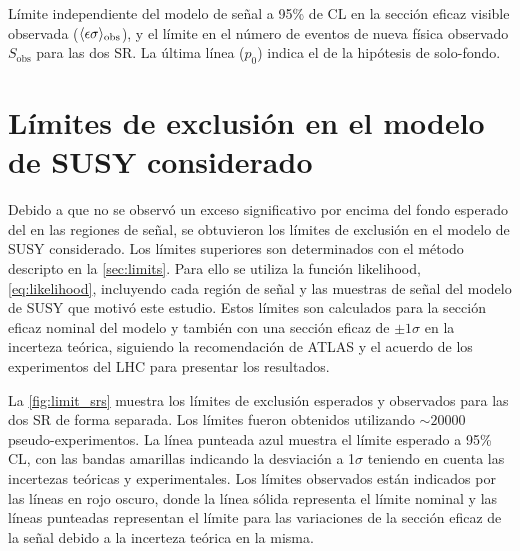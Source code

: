 \begin{table}[!htbp]
  \centering

  \caption{Límite independiente del modelo de señal a 95\% de CL en la
    sección eficaz visible observada ($\langle\epsilon{\rm \sigma}\rangle_{\rm obs}$),
    y el límite en el número de eventos de nueva física observado
    $S_\text{obs}$ para las dos SR.
    La última línea ($p_0$) indica el {\pvalue} de la hipótesis de solo-fondo.}
  \label{tab:upperlimits}

  

\end{table}


\clearpage


\section{Límites de exclusión en el modelo de SUSY considerado}
\label{sec:susy_limits}

Debido a que no se observó un exceso significativo por encima del fondo esperado
del {\SM} en las regiones de señal, se obtuvieron los límites de exclusión en el
modelo de SUSY considerado. Los límites superiores son determinados con el
método {\cls} descripto en la \cref{sec:limits}. Para ello se utiliza la función
likelihood, \cref{eq:likelihood}, incluyendo cada región de señal y las muestras
de señal del modelo de SUSY que motivó este estudio.
Estos límites son
calculados para la sección eficaz nominal del modelo y también con una sección
eficaz de $\pm 1 \sigma$ en la incerteza teórica, siguiendo la recomendación de
ATLAS y el acuerdo de los experimentos del LHC para presentar los resultados.

La \cref{fig:limit_srs} muestra los límites de exclusión esperados y
observados para las dos SR de forma separada. Los límites fueron obtenidos
utilizando $\sim 20000$ pseudo-experimentos. La línea punteada azul muestra el
límite esperado a 95\% CL, con las bandas amarillas indicando la desviación a
1$\sigma$ teniendo en cuenta las incertezas teóricas y experimentales. Los
límites observados están indicados por las líneas en rojo oscuro, donde la línea
sólida representa el límite nominal y las líneas punteadas representan el límite
para las variaciones de la sección eficaz de la señal debido a la incerteza
teórica en la misma.


